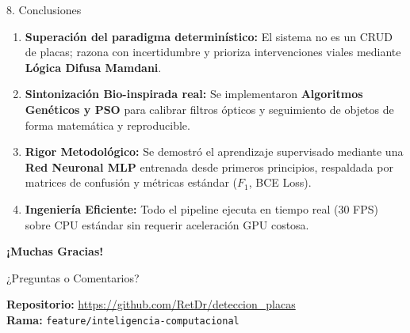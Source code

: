 \documentclass[aspectratio=169, 10pt]{beamer}
\begin{document}
\begin{frame}{8. Conclusiones}
    \begin{enumerate}
        \item \textbf{Superación del paradigma determinístico:} El sistema no es un CRUD de placas; razona con incertidumbre y prioriza intervenciones viales mediante \textbf{Lógica Difusa Mamdani}.
        \item \textbf{Sintonización Bio-inspirada real:} Se implementaron \textbf{Algoritmos Genéticos y PSO} para calibrar filtros ópticos y seguimiento de objetos de forma matemática y reproducible.
        \item \textbf{Rigor Metodológico:} Se demostró el aprendizaje supervisado mediante una \textbf{Red Neuronal MLP} entrenada desde primeros principios, respaldada por matrices de confusión y métricas estándar ($F_1$, BCE Loss).
        \item \textbf{Ingeniería Eficiente:} Todo el pipeline ejecuta en tiempo real (30 FPS) sobre CPU estándar sin requerir aceleración GPU costosa.
    \end{enumerate}
\end{frame}

\begin{frame}
    \begin{center}
        \Huge \textbf{¡Muchas Gracias!}
        \vspace{0.8cm}

        \Large ¿Preguntas o Comentarios?
        \vspace{0.6cm}

        \normalsize
        \textbf{Repositorio:} \url{https://github.com/RetDr/deteccion_placas}\\
        \textbf{Rama:} \texttt{feature/inteligencia-computacional}
    \end{center}
\end{frame}
\end{document}
